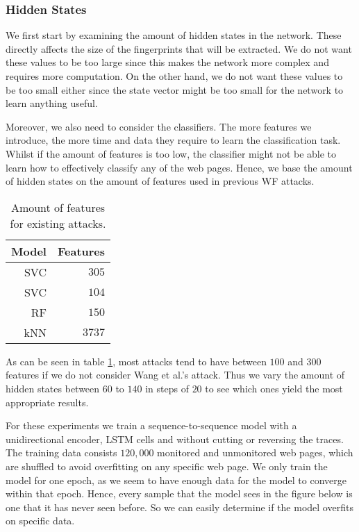 \subsubsection{Hidden States}

We first start by examining the amount of hidden states in the network.
These directly affects the size of the fingerprints that will be extracted.
We do not want these values to be too large since this makes the network more complex and requires more computation.
On the other hand, we do not want these values to be too small either since the state vector might be too small for the network to learn anything useful.

Moreover, we also need to consider the classifiers.
The more features we introduce, the more time and data they require to learn the classification task.
Whilst if the amount of features is too low, the classifier might not be able to learn how to effectively classify any of the web pages.
Hence, we base the amount of hidden states on the amount of features used in previous WF attacks.

\begin{table}[ht]
  \centering
  \begin{tabular}{ r r } \hline
    \multicolumn{1}{c}{\textbf{Model}} & \multicolumn{1}{c}{\textbf{Features}} \\ \hline
    SVC \cite{panchenko1} & $305$ \\
    SVC \cite{panchenko2} & $104$ \\
    RF \cite{kfingerprinting} & $150$ \\
    kNN \cite{wang_cai_johnson_nithyanand_goldberg_2014} & $3737$ \\
    \hline
  \end{tabular}
  \caption{Amount of features for existing attacks.}
  \label{table:feature-wf-attacks}
\end{table}

As can be seen in table \ref{table:feature-wf-attacks}, most attacks tend to have between $100$ and $300$ features if we do not consider Wang et al.'s attack.
Thus we vary the amount of hidden states between $60$ to $140$ in steps of $20$ to see which ones yield the most appropriate results.

For these experiments we train a sequence-to-sequence model with a unidirectional encoder, LSTM cells and without cutting or reversing the traces.
The training data consists $120,000$ monitored and unmonitored web pages, which are shuffled to avoid overfitting on any specific web page.
We only train the model for one epoch, as we seem to have enough data for the model to converge within that epoch.
Hence, every sample that the model sees in the figure below is one that it has never seen before.
So we can easily determine if the model overfits on specific data.

